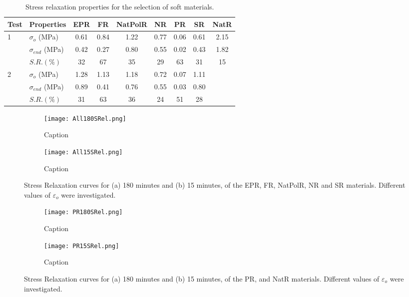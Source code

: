 \begin{table*}[htb!]
\centering
\caption{Stress relaxation properties for the selection of soft materials.}
\label{tbl:stressRelProperties}
\begin{tabular}{llccccccc} \toprule
Test & Properties & EPR & FR & NatPolR & NR & PR & SR & NatR \\
\hline
\multirow{3}{*}{1}  & $\sigma_o$ (MPa)   & 0.61      & 0.84      & 1.22      & 0.77      & 0.06      & 0.61      & 2.15 \\
                & $\sigma_{end}$ (MPa)    & 0.42      & 0.27      & 0.80      & 0.55      & 0.02      & 0.43      & 1.82 \\
                & $S.R. (\%)$    &  32     & 67      & 35      & 29      & 63      & 31      & 15 \\
                     
\hline 
\multirow{3}{*}{2}  & $\sigma_o$ (MPa)     & 1.28      & 1.13      & 1.18      & 0.72      & 0.07      & 1.11  &         \\
                & $\sigma_{end}$ (MPa)     & 0.89      & 0.41      & 0.76      & 0.55      & 0.03      & 0.80  &          \\
                & $S.R. (\%)$     & 31      & 63      & 36      & 24      & 51      & 28  &          \\
\bottomrule
\end{tabular}
\end{table*}


\begin{figure}[H]
    \centering
        \begin{subfigure}[b]{0.93\textwidth}
        \centering
        \texttt{[image: All180SRel.png]}
        \caption{Caption}
        \label{sfig:ALL180SRel}
    \end{subfigure}
    \begin{subfigure}[b]{0.93\textwidth}
        \centering
        \texttt{[image: All15SRel.png]}
        \caption{Caption}
        \label{sfig:centering}
    \end{subfigure}
    \caption{Stress Relaxation curves for (a) 180 minutes and (b) 15 minutes, of the EPR, FR, NatPolR, NR and SR materials. Different values of $\varepsilon_o$ were investigated.}
    \label{fig:AllSRel}
\end{figure}

\newpage
\begin{figure}[H]
    \centering
        \begin{subfigure}[b]{0.93\textwidth}
        \centering
        \texttt{[image: PR180SRel.png]}
        \caption{Caption}
        \label{sfig:PR180SRel}
    \end{subfigure}
    \begin{subfigure}[b]{0.93\textwidth}
        \centering
        \texttt{[image: PR15SRel.png]}
        \caption{Caption}
        \label{sfig:PR15SRel}
    \end{subfigure}
    \caption{Stress Relaxation curves for (a) 180 minutes and (b) 15 minutes, of the PR, and NatR materials. Different values of $\varepsilon_o$ were investigated.}
    \label{fig:PRSRel}
\end{figure}


